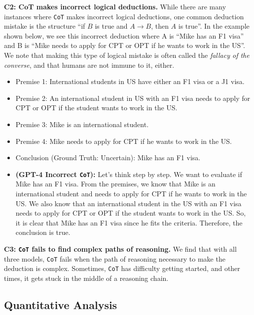 \documentclass[11pt]{article}
\begin{document}
\textbf{C2: CoT makes incorrect logical deductions.} While there are many instances where \texttt{CoT} makes incorrect logical deductions, one common deduction mistake is the structure ``if $B$ is true and $A \rightarrow B$, then $A$ is true''. In the example shown below, we see this incorrect deduction where A is ``Mike has an F1 visa'' and B is ``Mike needs to apply for CPT or OPT if he wants to work in the US''. We note that making this type of logical mistake is often called the \emph{fallacy of the converse}, and that humans are not immune to it, either.

\begin{itemize}[leftmargin=*]
\itemsep0.1em
    \item[] \small Premise 1: International students in US have either an F1 visa or a J1 visa.
    \item[] \small Premise 2: An international student in US with an F1 visa needs to apply for CPT or OPT if the student wants to work in the US.
    \item[] \small Premise 3: Mike is an international student.
    \item[] \small Premise 4: Mike needs to apply for CPT if he wants to work in the US.
    \item[] \small Conclusion (Ground Truth: Uncertain): Mike has an F1 visa.
    \item[] \small \textbf{(GPT-4 Incorrect \texttt{CoT}):} Let's think step by step. We want to evaluate if Mike has an F1 visa. From the premises, we know that Mike is an international student and needs to apply for CPT if he wants to work in the US. We also know that an international student in the US with an F1 visa needs to apply for CPT or OPT if the student wants to work in the US. So, it is clear that Mike has an F1 visa since he fits the criteria. Therefore, the conclusion is true.
\end{itemize}

\textbf{C3: \texttt{CoT} fails to find complex paths of reasoning.} We find that with all three models, \texttt{CoT} fails when the path of reasoning necessary to make the deduction is complex. Sometimes, \texttt{CoT} has difficulty getting started, and other times, it gets stuck in the middle of a reasoning chain.

\subsection{Quantitative Analysis}
\end{document}
